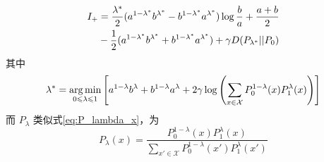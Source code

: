 \begin{lemma}\label{lem:I_plus_expression}
\begin{align}\label{equation:I+}
    I_+ &=\frac{\lambda^* }{2} (a^{1-\lambda^* }b^{\lambda^* } -
    b^{1-\lambda^* }a^{\lambda^* })\log\frac{b}{a}+\frac{a+b}{2}\notag \\
    &\quad -\frac{1}{2}(a^{1-\lambda^*}b^{\lambda^*} +
    b^{1-\lambda^* }a^{\lambda^* })+\gamma D(P_{\lambda^* }||P_0) 
	\end{align}
	其中
	\begin{equation}\label{eq:lambda}
    \lambda^* = \argmin_{0 \leq \lambda \leq 1} \left[a^{1-\lambda}b^{\lambda} +
    b^{1-\lambda}a^{\lambda} + 2\gamma \log
    \left(\sum_{x\in \mathcal{X}}P^{1-\lambda}_0(x) P^{\lambda}_1(x)
    \right)
    \right]
\end{equation}
而 $P_{\lambda}$ 类似式\eqref{eq:P_lambda_x}，为
\begin{equation}\label{eq:P_lambda_0_1}
    P_{\lambda}(x) = \frac{P_0^{1-\lambda}(x) P_1^{\lambda} (x)}
    {\sum_{x' \in \mathcal{X}}P_0^{1-\lambda}(x') 
    P_1^{\lambda} (x')}        
\end{equation}

\end{lemma}


